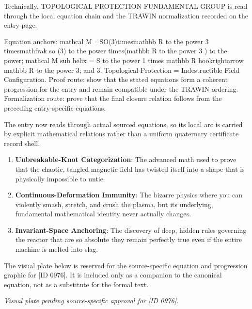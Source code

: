 Technically, TOPOLOGICAL PROTECTION FUNDAMENTAL GROUP is read through the local equation chain and the TRAWIN normalization recorded on the entry page.

Equation anchors: mathcal M =SO(3)timesmathbb R to the power 3 timesmathfrak so (3) to the power times(mathbb R to the power 3 ) to the power; mathcal M sub helix = S to the power 1 times mathbb R hookrightarrow mathbb R to the power 3; and 3. Topological Protection = Indestructible Field Configuration. Proof route: show that the stated equations form a coherent progression for the entry and remain compatible under the TRAWIN ordering. Formalization route: prove that the final closure relation follows from the preceding entry-specific equations.

The entry now reads through actual sourced equations, so its local arc is carried by explicit mathematical relations rather than a uniform quaternary certificate record shell.
\endgroup

\begin{enumerate}[leftmargin=1.6em,itemsep=6pt,topsep=4pt]
\item \textbf{Unbreakable-Knot Categorization}: The advanced math used to prove that the chaotic, tangled magnetic field has twisted itself into a shape that is physically impossible to untie.
\item \textbf{Continuous-Deformation Immunity}: The bizarre physics where you can violently smash, stretch, and crush the plasma, but its underlying, fundamental mathematical identity never actually changes.
\item \textbf{Invariant-Space Anchoring}: The discovery of deep, hidden rules governing the reactor that are so absolute they remain perfectly true even if the entire machine is melted into slag.
\end{enumerate}

\begingroup\footnotesize\sloppy
The visual plate below is reserved for the source-specific equation and progression graphic for [ID 0976]. It is included only as a companion to the canonical equation, not as a substitute for the formal text.
\par\endgroup
\begingroup\footnotesize\itshape
Visual plate pending source-specific approval for [ID 0976].
\par\endgroup

